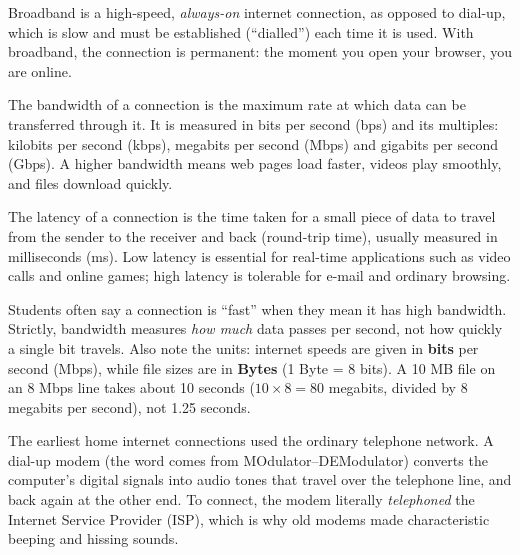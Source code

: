\documentclass[11pt]{article}
\newcommand{\cle}[1]{{\popxbold\color{popdark}#1}}
\newcounter{popsec}
\newcounter{popsub}
\newcommand{\courssub}[1]{%
  \stepcounter{popsub}%
  \par\vspace{9pt}\noindent{\popxbold\fontsize{11.5}{13}\selectfont\color{popink}{\color{poporange}\thepopsec.\thepopsub}\hspace{6pt}#1}\par\nopagebreak\vspace{4pt}
}
\begin{document}
\begin{definition}[Broadband]
\cle{Broadband} is a high-speed, \emph{always-on} internet connection, as opposed to dial-up, which is slow and must be established (``dialled'') each time it is used. With broadband, the connection is permanent: the moment you open your browser, you are online.
\end{definition}

\begin{definition}[Bandwidth]
The \cle{bandwidth} of a connection is the maximum rate at which data can be transferred through it. It is measured in bits per second (bps) and its multiples: kilobits per second (kbps), megabits per second (Mbps) and gigabits per second (Gbps). A higher bandwidth means web pages load faster, videos play smoothly, and files download quickly.
\end{definition}

\begin{definition}[Latency]
The \cle{latency} of a connection is the time taken for a small piece of data to travel from the sender to the receiver and back (round-trip time), usually measured in milliseconds (ms). Low latency is essential for real-time applications such as video calls and online games; high latency is tolerable for e-mail and ordinary browsing.
\end{definition}

\begin{attention}
Students often say a connection is ``fast'' when they mean it has high bandwidth. Strictly, bandwidth measures \emph{how much} data passes per second, not how quickly a single bit travels. Also note the units: internet speeds are given in \textbf{bits} per second (Mbps), while file sizes are in \textbf{Bytes} (1 Byte = 8 bits). A 10 MB file on an 8 Mbps line takes about 10 seconds ($10 \times 8 = 80$ megabits, divided by 8 megabits per second), not 1.25 seconds.
\end{attention}

\courssub{Dial-up: the Historical Connection}

The earliest home internet connections used the ordinary telephone network. A \cle{dial-up modem} (the word comes from MOdulator--DEModulator) converts the computer's digital signals into audio tones that travel over the telephone line, and back again at the other end. To connect, the modem literally \emph{telephoned} the Internet Service Provider (ISP), which is why old modems made characteristic beeping and hissing sounds.
\end{document}
